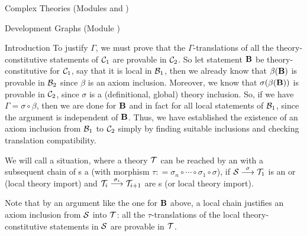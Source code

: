 \begin{tchapter}[id=complex-theories,short=Complex Theories]{Complex Theories (Modules
    {} and {})}
\begin{tsection}[id=development-graphs,short=Development Graphs]{Development Graphs
    (Module {})}
\begin{tsubsection}[id=dg-intro,short=Introduction]{Introduction}
To justify $\Gamma$, we must prove that the
$\Gamma$-translations of all the theory-constitutive statements of ${\cal C}_1$ are provable in
${\cal C}_2$. So let statement ${\bf B}$ be theory-constitutive for ${\cal C}_1$, say that it is local
in ${\cal B}_1$, then we already know that $\beta({\bf B})$ is provable in ${\cal B}_2$ since $\beta$ is
an axiom inclusion. Moreover, we know that $\sigma(\beta({\bf B}))$ is provable in ${\cal C}_2$,
since $\sigma$ is a (definitional, global) theory inclusion. So, if we have
$\Gamma=\sigma\circ\beta$, then we are done for ${\bf B}$ and in fact for all local statements
of ${\cal B}_1$, since the argument is independent of ${\bf B}$. Thus, we have established the
existence of an axiom inclusion from ${\cal B}_1$ to ${\cal C}_2$ simply by finding suitable
inclusions and checking translation compatibility.

We will call a situation, where a theory ${\cal T}$ can be reached by an {} with a subsequent chain of {s} a
{} (with morphism
$\tau\colon=\sigma_n\circ\cdots\circ\sigma_1\circ\sigma$), if
${\cal S}\stackrel\sigma\longrightarrow{\cal T}_1$ is an {} or (local
theory import) and ${\cal T}_i\stackrel{\sigma_i}\longrightarrow{\cal T}_{i+1}$ are
{s} (or local theory import).
\begin{center}
\end{center}

Note that by an argument like the one for ${\bf B}$ above, a local chain justifies an axiom
inclusion from ${\cal S}$ into ${\cal T}$: all the $\tau$-translations of the local
theory-constitutive statements in ${\cal S}$ are provable in ${\cal T}$.


\end{tsubsection}
\end{tsection}
\end{tchapter}
